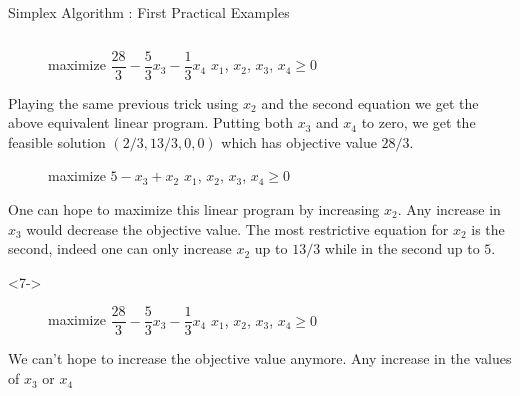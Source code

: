 \documentclass[aspectratio = 169]{beamer}
\begin{document}
\begin{frame}{Simplex Algorithm : First Practical Examples}
\begin{columns}
\begin{column}{.5\textwidth}
\begin{onlyenv}
{{\begin{figure}
{\begin{linearProg}{
                        maximize
                      }{
                        $\dfrac{28}{3} - \dfrac{5}{3}x_3 - \dfrac{1}{3}x_4$
                      }{
                      }{
                        $x_1$, $x_2$, $x_3$, $x_4 \geq 0$
                      }
                    \end{linearProg}
                  }
                \end{figure}
              }
              \vspace{-1em}
              Playing the same previous trick using $x_2$ and the
              second equation we get the above equivalent linear
              program. Putting both $x_3$ and $x_4$ to zero, we get
              the feasible solution $(2/3, 13/3, 0, 0)$ which has
              objective value $28/3$.  }{
                \begin{figure}
                  \small{
                    \begin{linearProg}{
                        maximize
                      }{
                        $5 - x_3 + x_2$
                      }{
                      }{
                        $x_1$, $x_2$, $x_3$, $x_4 \geq 0$
                      }
                    \end{linearProg}
                  }
                \end{figure}
                One can hope to maximize this linear program by
                increasing $x_2$. Any increase in $x_3$ would decrease
                the objective value. The most restrictive equation for
                $x_2$ is the second, indeed one can only increase
                $x_2$ up to $13/3$ while in the second up to $5$.  }
            \end{onlyenv}
            \begin{onlyenv}<7->
                \begin{figure}
                  \small{
                    \begin{linearProg}{
                        maximize
                      }{
                        $\dfrac{28}{3} - \dfrac{5}{3}x_3 - \dfrac{1}{3}x_4$
                      }{
                      }{
                        $x_1$, $x_2$, $x_3$, $x_4 \geq 0$
                      }
                    \end{linearProg}
                  }
                \end{figure}
                \vspace{-1em}
                We can't hope to increase the objective value
                anymore. Any increase in the values of $x_3$ or $x_4$

\end{onlyenv}
\end{column}
\end{columns}
\end{frame}
\end{document}
